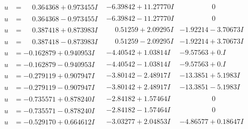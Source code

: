 \documentclass[1p]{elsarticle_modified}
\theoremstyle{definition}
\begin{document}
$$\begin{array}{c|c|c}
\begin{aligned}
u &= \phantom{-}0.364368 + 0.973455 I\end{aligned}
 & -6.39842 + 11.27770 I & \phantom{-0.000000 } 0 \\ \hline\begin{aligned}
u &= \phantom{-}0.364368 - 0.973455 I\end{aligned}
 & -6.39842 - 11.27770 I & \phantom{-0.000000 } 0 \\ \hline\begin{aligned}
u &= \phantom{-}0.387418 + 0.873983 I\end{aligned}
 & \phantom{-}0.51259 + 2.09295 I & -1.92214 - 3.70673 I \\ \hline\begin{aligned}
u &= \phantom{-}0.387418 - 0.873983 I\end{aligned}
 & \phantom{-}0.51259 - 2.09295 I & -1.92214 + 3.70673 I \\ \hline\begin{aligned}
u &= -0.162879 + 0.940953 I\end{aligned}
 & -4.40542 + 1.03814 I & -9.57563 + 0. I\phantom{ +0.000000I} \\ \hline\begin{aligned}
u &= -0.162879 - 0.940953 I\end{aligned}
 & -4.40542 - 1.03814 I & -9.57563 + 0. I\phantom{ +0.000000I} \\ \hline\begin{aligned}
u &= -0.279119 + 0.907947 I\end{aligned}
 & -3.80142 - 2.48917 I & -13.3851 + 5.1983 I \\ \hline\begin{aligned}
u &= -0.279119 - 0.907947 I\end{aligned}
 & -3.80142 + 2.48917 I & -13.3851 - 5.1983 I \\ \hline\begin{aligned}
u &= -0.735571 + 0.878240 I\end{aligned}
 & -2.84182 + 1.57464 I & \phantom{-0.000000 } 0 \\ \hline\begin{aligned}
u &= -0.735571 - 0.878240 I\end{aligned}
 & -2.84182 - 1.57464 I & \phantom{-0.000000 } 0 \\ \hline\begin{aligned}
u &= -0.529170 + 0.664612 I\end{aligned}
 & -3.03277 + 2.04853 I & -4.86577 + 0.18647 I \\ \hline\begin{aligned}

\end{aligned}
\end{array}$$
\end{document}
